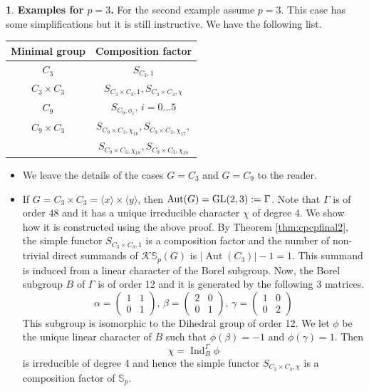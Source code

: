 \documentclass[12pt]{article}
\theoremstyle{plain}
\theoremstyle{definition}
\newtheorem{nothing}[theorem]{}
\newcommand{\kerlin}{\mathbb S_p}
\newcommand{\ind}{\operatorname{Ind}}
\newcommand{\Aut}{\operatorname{Aut}}
\begin{document}
\begin{nothing}{\bf Examples for $p=3$.}
    For the second example assume $p=3$. This case has some simplifications but it is still instructive. We have the following list.
\begin{table}[h!]
\centering
\begin{tabular}{|c|c|}
\hline
    Minimal group & Composition factor \\ \hline
    $C_3$ & $S_{C_3, 1}$ \\
    $C_3 \times C_3$ & $S_{C_3\times C_3, 1}, S_{C_3\times C_3, \chi}$ \\
    $C_9$ & $S_{C_9, \phi_i}, \, i=0\ldots 5$ \\
    $C_9 \times C_3$ & $S_{C_9\times C_3, \chi_{16}}, S_{C_9\times C_3, \chi_{17}},$ \\
    & $S_{C_9\times C_3, \chi_{18}}, S_{C_9\times C_3, \chi_{19}}$ \\
    \hline
\end{tabular}
\end{table}

    
\begin{itemize}
    \item We leave the details of the cases $G=C_3$ and $G=C_9$ to the reader.
    \item If $G=C_3\times C_3=\langle x\rangle\times \langle y\rangle$, then $\Aut(G) = {\rm GL}(2, 3):= \Gamma$. Note that $\Gamma$ is of order $48$ and it has a unique irreducible character $\chi$ of degree 4. We show how it is constructed using the above proof. By Theorem \ref{thm:cpcpfinal2}, the simple functor $S_{C_3\times C_3, 1}$ is a composition factor and the number of non-trivial direct summands of $\mathcal{K}\kerlin(G)$ is $|\Aut(C_3)|-1 = 1$. This summand is induced from a linear character of the Borel subgroup.
    Now, the Borel subgroup $B$ of $\Gamma$ is of order 12 and it is generated by the following 3 matrices.
    \[
    \alpha = \begin{pmatrix}
        1&1\\0&1
    \end{pmatrix},\, \beta=\begin{pmatrix}
        2&0\\0&1
    \end{pmatrix},\, \gamma=\begin{pmatrix}
        1&0\\0&2
    \end{pmatrix}
    \]
    This subgroup is isomorphic to the Dihedral group of order 12. 
    We let $\phi$ be the unique linear character of $B$ such that $\phi(\beta) = -1$ and $\phi(\gamma) = 1$. Then 
    \[
    \chi = \ind_B^\Gamma\phi
    \]
    is irreducible of degree 4 and hence the simple functor $S_{C_3\times C_3, \chi}$ is a composition factor of $\kerlin$. 


\end{itemize}
\end{nothing}
\end{document}
